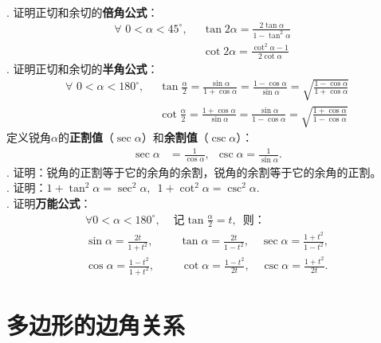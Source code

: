 \documentclass[12pt,UTF8,fontset=none]{ctexbook}
\begin{document}
\begin{xt}\label{xt:2-5-10}
    \mbox{} \\
    . 证明正切和余切的\textbf{倍角公式}：
    \begin{align*}
        \forall \,\, 0 < \alpha < 45^\circ, \,\,\,& \tan 2\alpha = \frac{2\tan \alpha}{1 - \tan^2 \alpha} &  \\
        &\cot 2\alpha = \frac{\cot^2 \alpha - 1}{2 \cot \alpha} &  
    \end{align*}
    . 证明正切和余切的\textbf{半角公式}：
    \begin{align*}
        \forall \,\, 0 < \alpha < 180^\circ, \,\,\,& \tan \frac{\alpha}{2} = \frac{\sin \alpha}{1 + \cos \alpha} = \frac{1 - \cos \alpha}{\sin \alpha} = \sqrt{\frac{1 - \cos \alpha}{1 + \cos \alpha}} \\
        & \cot \frac{\alpha}{2} = \frac{1 + \cos \alpha}{\sin \alpha} = \frac{\sin \alpha}{1 - \cos \alpha} = \sqrt{\frac{1 + \cos \alpha}{1 - \cos \alpha}}  
    \end{align*}
    定义锐角$\alpha$的\textbf{正割值}（$\sec \alpha$）和\textbf{余割值}（$\csc \alpha$）：
    \begin{align*}
        \sec \alpha &= \frac{1}{\cos \alpha}, \,\,\, \csc \alpha = \frac{1}{\sin \alpha}.  
    \end{align*}
    . 证明：锐角的正割等于它的余角的余割，锐角的余割等于它的余角的正割。\\
    . 证明：$ 1 + \tan^2 \alpha = \sec^2 \alpha , \,\,\, 1 + \cot^2 \alpha = \csc^2 \alpha. $\\
    . 证明\textbf{万能公式}：
    \begin{align*}
        \forall 0 < \alpha < 180^\circ, & \mbox{ 记} \tan\frac{\alpha}{2} = t, \,\,\, \mbox{则：} \\
        \sin \alpha = \frac{2t}{1 + t^2}, & \,\,\,\,\, \tan \alpha = \frac{2t}{1 - t^2}, \,\,\,\,\,\, \sec \alpha = \frac{1 + t^2}{1 -t^2},  \\
        \cos \alpha = \frac{1 -t^2}{1 + t^2}, & \,\,\,\,\,\, \cot \alpha = \frac{1 - t^2}{2t}, \,\,\,\,\,\, \csc \alpha = \frac{1 + t^2}{2t}.   
    \end{align*}
\end{xt}

\section{多边形的边角关系}
\end{document}

